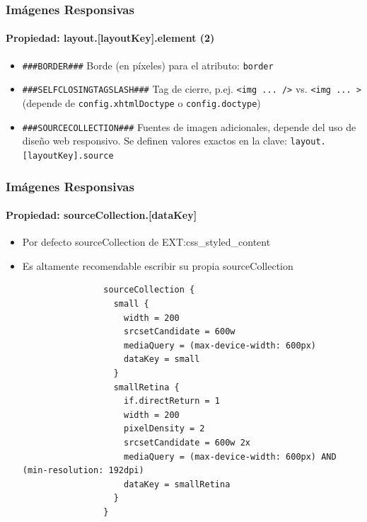 \begin{frame}[fragile]
	\frametitle{Imágenes Responsivas}
	\framesubtitle{Propiedad: layout.[layoutKey].element (2)}

		\begin{itemize}
			\item \lstinline!###BORDER###!\newline
				Borde (en píxeles) para el atributo: \texttt{border}

			\item \lstinline!###SELFCLOSINGTAGSLASH###!\newline
				Tag de cierre, p.ej. \texttt{<img ... />} vs. \texttt{<img ... >}\newline
				(depende de \texttt{config.xhtmlDoctype} o \texttt{config.doctype})

			\item \lstinline!###SOURCECOLLECTION###!\newline
				Fuentes de imagen adicionales, depende del uso de diseño web responsivo.
				Se definen valores exactos en la clave: \texttt{layout.[layoutKey].source}

	\end{itemize}

\end{frame}


\begin{frame}[fragile]
	\frametitle{Imágenes Responsivas}
	\framesubtitle{Propiedad: sourceCollection.[dataKey]}

	\begin{itemize}
		\item Por defecto sourceCollection de EXT:css\_styled\_content
		\item Es altamente recomendable escribir su propia sourceCollection

			\lstset{
				basicstyle=\tiny\ttfamily
			}

			\begin{lstlisting}
				sourceCollection {
				  small {
				    width = 200
				    srcsetCandidate = 600w
				    mediaQuery = (max-device-width: 600px)
				    dataKey = small
				  }
				  smallRetina {
				    if.directReturn = 1
				    width = 200
				    pixelDensity = 2
				    srcsetCandidate = 600w 2x
				    mediaQuery = (max-device-width: 600px) AND (min-resolution: 192dpi)
				    dataKey = smallRetina
				  }
				}
			\end{lstlisting}
	\end{itemize}

\end{frame}

